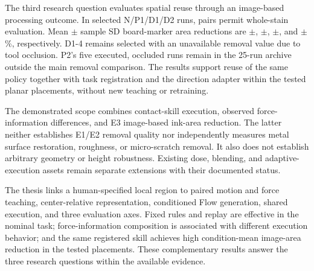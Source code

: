 The third research question evaluates spatial reuse through an image-based processing outcome. In \EthreeMainN{} selected N/P1/D1/D2 runs, \EthreeImageN{} pairs permit whole-stain evaluation. Mean \(\pm\) sample SD board-marker area reductions are \EthreeNRemoval\(\pm\)\EthreeNSD, \EthreePoneRemoval\(\pm\)\EthreePoneSD, \EthreeDoneRemoval\(\pm\)\EthreeDoneSD, and \EthreeDtwoRemoval\(\pm\)\EthreeDtwoSD\%, respectively. D1-4 remains selected with an unavailable removal value due to tool occlusion. P2's five executed, occluded runs remain in the 25-run archive outside the main removal comparison. The results support reuse of the same policy together with task registration and the direction adapter within the tested planar placements, without new teaching or retraining.

The demonstrated scope combines contact-skill execution, observed force-information differences, and E3 image-based ink-area reduction. The latter neither establishes E1/E2 removal quality nor independently measures metal surface restoration, roughness, or micro-scratch removal. It also does not establish arbitrary geometry or height robustness. Existing dose, blending, and adaptive-execution assets remain separate extensions with their documented status.

The thesis links a human-specified local region to paired motion and force teaching, center-relative representation, conditioned Flow generation, shared execution, and three evaluation axes. Fixed rules and replay are effective in the nominal task; force-information composition is associated with different execution behavior; and the same registered skill achieves high condition-mean image-area reduction in the tested placements. These complementary results answer the three research questions within the available evidence.
